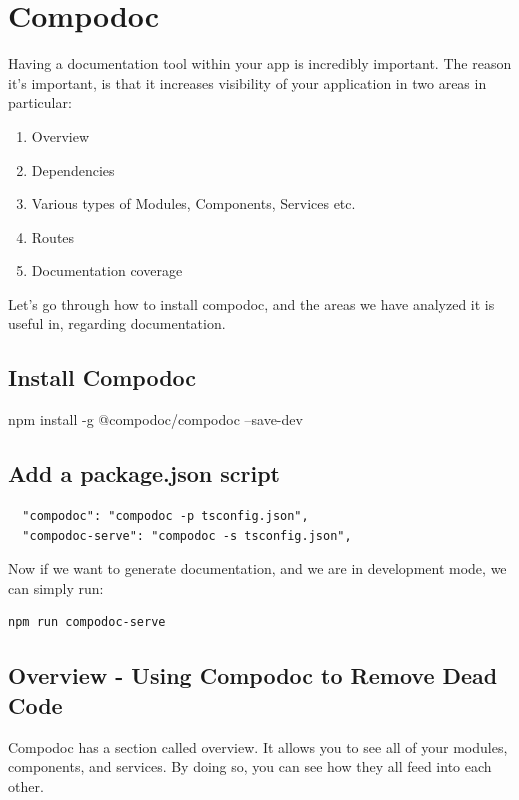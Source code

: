
\chapter{ Compodoc }
Having a documentation tool within your app is incredibly important. The reason it's important, is that it increases visibility of your application in two areas in particular:
\begin{enumerate}
  \item Overview 
  \item Dependencies
  \item Various types of Modules, Components, Services etc. 
  \item Routes
  \item Documentation coverage
\end{enumerate}

Let's go through how to install compodoc, and the areas we have analyzed it is useful in, regarding documentation. 

\section{ Install Compodoc }
npm install -g @compodoc/compodoc --save-dev

\section{ Add a package.json script }
\begin{verbatim}
  "compodoc": "compodoc -p tsconfig.json",
  "compodoc-serve": "compodoc -s tsconfig.json",
\end{verbatim}

Now if we want to generate documentation, and we are in development mode, we can simply run:
\begin{verbatim}
npm run compodoc-serve  
\end{verbatim}

\section{Overview - Using Compodoc to Remove Dead Code}
Compodoc has a section called overview. It allows you to see all of your modules, components, and services. By doing so, you can see how they all feed into each other. 

